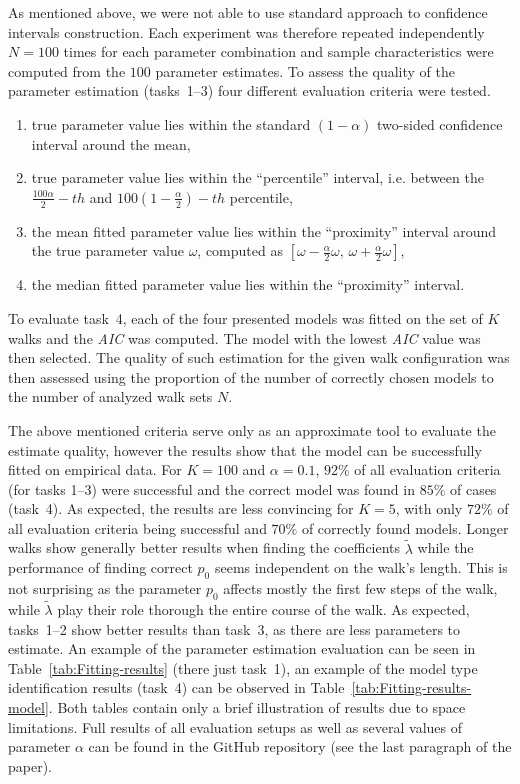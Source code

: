\documentclass{amsart}
\theoremstyle{definition}
\theoremstyle{plain}
\theoremstyle{plain}
\theoremstyle{plain}
\numberwithin{equation}{section}
\begin{document}
    As mentioned above, we were not able to use standard approach to confidence intervals {\color{red}construction}.
    Each experiment was therefore repeated independently $N=100$ times for each parameter combination and sample characteristics were computed from the $100$ parameter estimates.
    To assess the quality of the parameter estimation (tasks~1--3) four different evaluation criteria were tested.
    \begin{enumerate}
        \item true parameter value lies within the standard $(1-\alpha)$ two-sided confidence interval around the mean,
        \item true parameter value lies within the ``percentile'' interval, i.e. between the $\frac{{100}\alpha}{2}-th$ and $100\left(1-\frac{\alpha}{2}\right)-th$ percentile,
        \item the mean fitted parameter value lies within the ``proximity'' interval around the true parameter value $\omega$, computed as $[\omega-\frac{\alpha}{2}\omega,\,\omega+\frac{\alpha}{2}\omega]$,
        \item the median fitted parameter value lies within the ``proximity'' interval.
    \end{enumerate}

    To evaluate task~4, each of the four presented models was fitted on the set of $K$ walks and the \emph{AIC} was computed.
    The model with the lowest \emph{AIC} value was then selected.
    The quality of such estimation for the given walk configuration was then assessed using the proportion of the number of correctly chosen models to the number of analyzed walk sets $N$.

    The above mentioned criteria serve only as an approximate tool to evaluate the estimate quality, however the results show that the model can be successfully fitted on empirical data.
    For $K=100$ and $\alpha=0.1$, $92\%$ of all evaluation criteria (for tasks 1--3) were successful and the correct model was found in $85\%$ of cases (task~4).
    As expected, the results are less convincing for $K=5$, with only $72\%$ of all evaluation criteria being successful and $70\%$ of correctly found models.
    Longer walks show generally better results when finding the coefficients $\tilde{\lambda}$ while the performance of finding correct $p_0$ seems independent on the walk's length.
    This is not surprising as the parameter $p_0$ affects mostly the first few steps of the walk, while $\tilde{\lambda}$ play their role thorough the entire course of the walk.
    As expected, tasks~1--2 show better results than task~3, as there are less parameters to estimate.
    An example of the parameter estimation evaluation can be seen in Table~\ref{tab:Fitting-results} (there just task~1), an example of the model type identification results (task~4) can be observed in Table~\ref{tab:Fitting-results-model}.
    Both tables contain only a brief illustration of results due to space limitations.
    Full results of all evaluation setups as well as several values of parameter $\alpha$ can be found in the GitHub repository (see the last paragraph of the paper).
\end{document}
